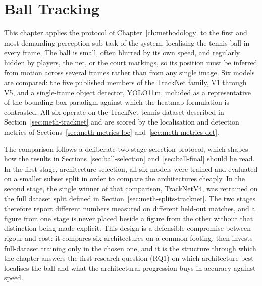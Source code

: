 \chapter{Ball Tracking}
\label{ch:ball}


This chapter applies the protocol of Chapter~\ref{ch:methodology} to the first
and most demanding perception sub-task of the system, localising the tennis
ball in every frame. The ball is small, often blurred by its own speed, and
regularly hidden by players, the net, or the court markings, so its position
must be inferred from motion across several frames rather than from any single
image. Six models are compared: the five published members of the TrackNet
family, V1 through V5, and a single-frame object detector, YOLO11m, included as
a representative of the bounding-box paradigm against which the heatmap
formulation is contrasted. All six operate on the TrackNet tennis dataset
described in Section~\ref{sec:meth-tracknet} and are scored by the localisation
and detection metrics of Sections~\ref{sec:meth-metrics-loc}
and~\ref{sec:meth-metrics-det}.

The comparison follows a deliberate two-stage selection protocol, which shapes
how the results in Sections~\ref{sec:ball-selection}
and~\ref{sec:ball-final} should be read. In the first stage, architecture
selection, all six models were trained and evaluated on a smaller subset split
in order to compare the architectures cheaply. In the second stage, the single
winner of that comparison, TrackNetV4, was retrained on the full dataset split
defined in Section~\ref{sec:meth-splits-tracknet}. The two stages therefore
report different numbers measured on different held-out matches, and a figure
from one stage is never placed beside a figure from the other without that
distinction being made explicit. This design is a defensible compromise between
rigour and cost: it compares six architectures on a common footing, then
invests full-dataset training only in the chosen one, and it is the structure
through which the chapter answers the first research question (RQ1) on which
architecture best localises the ball and what the architectural progression
buys in accuracy against speed.

